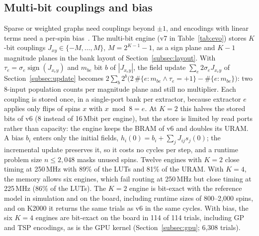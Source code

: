\subsection{Multi-bit couplings and bias}\label{subsec:multibit}
Sparse or weighted graphs need couplings beyond $\pm1$, and encodings with linear terms need a per-spin bias~\cite{lucas2014ising}. The multi-bit engine (v7 in Table~\ref{tab:evo}) stores $K$-bit couplings $J_{xy}\in\{-M,\dots,M\}$, $M=2^{K-1}-1$, as a sign plane and $K{-}1$ magnitude planes in the bank layout of Section~\ref{subsec:layout}. With $\tau_e=\sigma_e\operatorname{sign}(J_{x_ey})$ and $m_{be}$ bit $b$ of $|J_{x_ey}|$, the field update $\sum_e2\sigma_eJ_{x_ey}$ of Section~\ref{subsec:update} becomes $2\sum_b2^b\bigl(2\,\#\{e:m_{be}\wedge\tau_e{=}{+}1\}-\#\{e:m_{be}\}\bigr)$: two 8-input population counts per magnitude plane and still no multiplier. Each coupling is stored once, in a single-port bank per extractor, because extractor $e$ applies only flips of spins $x$ with $x\bmod8=e$. At $K=2$ this halves the stored bits of v6 (8 instead of 16\,Mbit per engine), but the store is limited by read ports rather than capacity: the engine keeps the BRAM of v6 and doubles its URAM. A bias $b_i$ enters only the initial fields, $h_i(0)=b_i+\sum_jJ_{ij}s_j(0)$; the incremental update preserves it, so it costs no cycles per step, and a runtime problem size $n\leq2{,}048$ masks unused spins. Twelve engines with $K=2$ close timing at 250\,MHz with 89\% of the LUTs and 81\% of the URAM. With $K=4$, the memory allows six engines, which fail routing at 250\,MHz but close timing at 225\,MHz (86\% of the LUTs). The $K=2$ engine is bit-exact with the reference model in simulation and on the board, including runtime sizes of 800--2{,}000 spins, and on K2000 it returns the same trials as v6 in the same cycles. With bias, the six $K=4$ engines are bit-exact on the board in 114 of 114 trials, including GP and TSP encodings, as is the GPU kernel (Section~\ref{subsec:gpu}; 6{,}308 trials).

